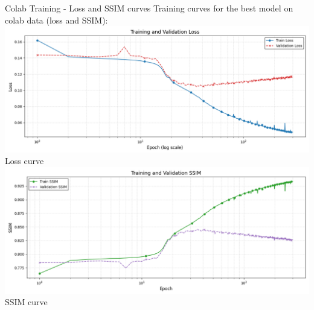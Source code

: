 \documentclass[8pt]{beamer}
\begin{document}
\begin{frame}[fragile]{Colab Training - Loss and SSIM curves}
    Training curves for the best model on colab data (loss and SSIM):
    \newline
    \includegraphics[width=0.7\linewidth]{images/colab_loss_curve.png}
    \newline
    \small Loss curve 
    \newline
    \includegraphics[width=0.7\linewidth]{images/colab_ssim_curve.png}
    \newline
    \small SSIM curve 
\end{frame}
\end{document}
